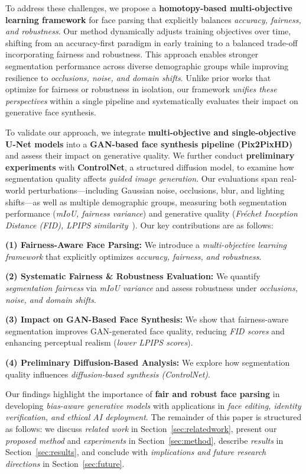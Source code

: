 To address these challenges, we propose a \textbf{homotopy-based multi-objective learning framework} for face parsing that explicitly balances \textit{accuracy, fairness, and robustness}. Our method dynamically adjusts training objectives over time, shifting from an accuracy-first paradigm in early training to a balanced trade-off incorporating fairness and robustness. This approach enables stronger segmentation performance across diverse demographic groups while improving resilience to \textit{occlusions, noise, and domain shifts}. Unlike prior works that optimize for fairness or robustness in isolation, our framework \textit{unifies these perspectives} within a single pipeline and systematically evaluates their impact on generative face synthesis.

To validate our approach, we integrate \textbf{multi-objective and single-objective U-Net models} into a \textbf{GAN-based face synthesis pipeline (Pix2PixHD)} and assess their impact on generative quality. We further conduct \textbf{preliminary experiments} with \textbf{ControlNet}, a structured diffusion model, to examine how segmentation quality affects \textit{guided image generation}. Our evaluations span real-world perturbations—including Gaussian noise, occlusions, blur, and lighting shifts—as well as multiple demographic groups, measuring both segmentation performance (\textit{mIoU, fairness variance}) and generative quality (\textit{Fréchet Inception Distance (FID), LPIPS similarity}~\cite{yu2021frechet, zhang2018perceptual}). Our key contributions are as follows:

\textbf{(1) Fairness-Aware Face Parsing:} We introduce a \textit{multi-objective learning framework} that explicitly optimizes \textit{accuracy, fairness, and robustness}. 

\textbf{(2) Systematic Fairness \& Robustness Evaluation:} We quantify \textit{segmentation fairness} via \textit{mIoU variance} and assess robustness under \textit{occlusions, noise, and domain shifts}. 

\textbf{(3) Impact on GAN-Based Face Synthesis:} We show that fairness-aware segmentation improves GAN-generated face quality, reducing \textit{FID scores} and enhancing perceptual realism (\textit{lower LPIPS scores}). 

\textbf{(4) Preliminary Diffusion-Based Analysis:} We explore how segmentation quality influences \textit{diffusion-based synthesis (ControlNet)}.


Our findings highlight the importance of \textbf{fair and robust face parsing} in developing \textit{bias-aware generative models} with applications in \textit{face editing, identity verification, and ethical AI deployment}. 
The remainder of this paper is structured as follows: we discuss \textit{related work} in Section~\ref{sec:relatedwork}, present our \textit{proposed method} and \textit{experiments} in Section~\ref{sec:method}, describe \textit{results} in Section~\ref{sec:results}, and conclude with \textit{implications and future research directions} in Section~\ref{sec:future}.
